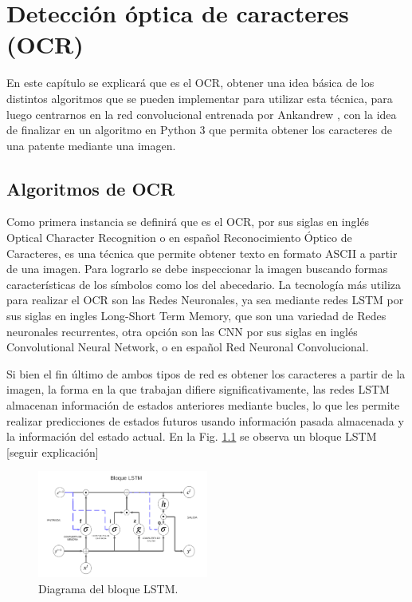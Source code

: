 \chapter{Detección óptica de caracteres (OCR)}

En este capítulo se explicará que es el OCR, obtener una idea básica
de los distintos algoritmos que se pueden implementar para
utilizar esta técnica, para luego centrarnos en la red convolucional entrenada por
Ankandrew \cite{ankandrew_reconocedor_2023}, con la idea de finalizar en un algoritmo en Python 3
que permita obtener los caracteres de una patente mediante una imagen.

\section{Algoritmos de OCR}

Como primera instancia se definirá que es el OCR, por sus siglas en inglés Optical Character
Recognition o en español Reconocimiento Óptico de Caracteres, es una técnica que permite
obtener texto en formato ASCII a partir de una imagen.
Para lograrlo se debe inspeccionar la imagen buscando formas características de los símbolos como los del abecedario.
La tecnología más utiliza para realizar el OCR son las Redes Neuronales, ya sea
mediante redes LSTM por sus siglas en ingles Long-Short Term Memory, que son una variedad de Redes
neuronales recurrentes, otra opción son las CNN por sus siglas en inglés Convolutional Neural Network, o en español Red Neuronal Convolucional.

Si bien el fin último de ambos tipos de red es obtener los caracteres a partir de la imagen, la forma en
la que trabajan difiere significativamente, las redes LSTM almacenan información de estados anteriores mediante bucles,
lo que les permite realizar predicciones de estados futuros usando información pasada almacenada y la información
del estado actual. En la Fig. \ref{fig:diagrama-LSTM} se observa un bloque LSTM [seguir explicación]
\begin{figure}[h]
    \centering
    \includegraphics[width=0.5\textwidth]{imgs/diagrama-lstm.png}
    \caption{Diagrama del bloque LSTM.}
    \label{fig:diagrama-LSTM}
\end{figure}


